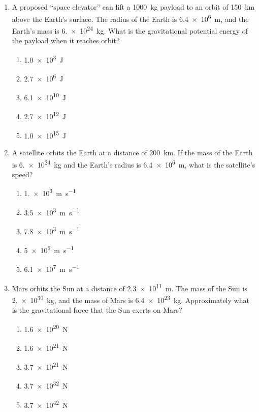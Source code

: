 \documentclass{../../../oss-apphys}
\begin{document}
\begin{multicols}{2}
\begin{enumerate}[leftmargin=18pt]
  \item A proposed ``space elevator'' can lift a \SI{1000}{\kilo\gram} payload
    to an orbit of \SI{150}{\kilo\metre} above the Earth's surface. The radius
    of the Earth is \SI{6.4e6}{\metre}, and the Earth's mass is
    \SI{6.e24}{\kilo\gram}. What is the gravitational potential energy of the
    payload when it reaches orbit?
    \begin{enumerate}[nosep,leftmargin=18pt,label=(\Alph*)]
    \item\SI{1.0e3}{\joule}
    \item\SI{2.7e6}{\joule}
    \item\SI{6.1e10}{\joule}
    \item\SI{2.7e12}{\joule}
    \item\SI{1.0e15}{\joule}
    \end{enumerate}

  \item A satellite orbits the Earth at a distance of \SI{200}{\km}. If the mass
    of the Earth is \SI{6.e24}{\kilo\gram} and the Earth's radius is
    \SI{6.4e6}{\metre}, what is the satellite's speed?
    \begin{enumerate}[nosep,leftmargin=18pt,label=(\Alph*)]
    \item\SI{1.e3}{\metre\per\second}
    \item\SI{3.5e3}{\metre\per\second}
    \item\SI{7.8e3}{\metre\per\second}
    \item\SI{5e6}{\metre\per\second}
    \item\SI{6.1e7}{\metre\per\second}
    \end{enumerate}

  \item Mars orbits the Sun at a distance of \SI{2.3e11}{\metre}. The mass of
    the Sun is \SI{2.e30}{\kilo\gram}, and the mass of Mars is
    \SI{6.4e23}{\kilo\gram}. Approximately what is the gravitational force that
    the Sun exerts on Mars?
    \begin{enumerate}[nosep,leftmargin=18pt,label=(\Alph*)]
    \item\SI{1.6e20}{\newton}
    \item\SI{1.6e21}{\newton}
    \item\SI{3.7e21}{\newton}
    \item\SI{3.7e32}{\newton}
    \item\SI{3.7e42}{\newton}
    \end{enumerate}
    \columnbreak
    

\end{enumerate}
\end{multicols}
\end{document}
